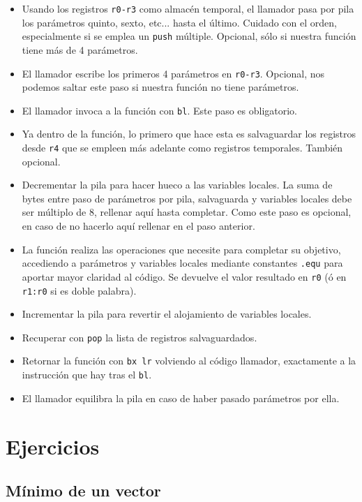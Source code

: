 \begin{itemize}
  \item Usando los registros {\tt r0-r3} como almacén temporal, el llamador pasa por pila
        los parámetros quinto, sexto, etc... hasta el último. Cuidado con el orden,
        especialmente si se emplea un {\tt push} múltiple. Opcional, sólo si nuestra
        función tiene más de 4 parámetros.
  \item El llamador escribe los primeros 4 parámetros en {\tt r0-r3}. Opcional, nos
        podemos saltar este paso si nuestra función no tiene parámetros.
  \item El llamador invoca a la función con {\tt bl}. Este paso es obligatorio.
  \item Ya dentro de la función, lo primero que hace esta es salvaguardar los registros
        desde {\tt r4} que se empleen más adelante como registros temporales. También opcional.
  \item Decrementar la pila para hacer hueco a las variables locales. La suma de bytes
        entre paso de parámetros por pila, salvaguarda y variables locales debe ser
        múltiplo de 8, rellenar aquí hasta completar. Como este paso es opcional, en caso
        de no hacerlo aquí rellenar en el paso anterior.
  \item La función realiza las operaciones que necesite para completar su objetivo, accediendo
        a parámetros y variables locales mediante constantes {\tt .equ} para aportar mayor claridad
        al código. Se devuelve el valor resultado en {\tt r0} (ó en {\tt r1:r0} si es doble
        palabra).
  \item Incrementar la pila para revertir el alojamiento de variables locales.
  \item Recuperar con {\tt pop} la lista de registros salvaguardados.
  \item Retornar la función con {\tt bx lr} volviendo al código llamador, exactamente a la
        instrucción que hay tras el {\tt bl}. 
  \item El llamador equilibra la pila en caso de haber pasado parámetros por ella.
\end{itemize}

\section{Ejercicios}

\subsection{Mínimo de un vector}

